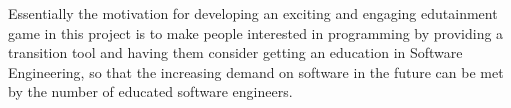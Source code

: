 Essentially the motivation for developing an exciting and engaging edutainment game in this project is to make people interested in programming by providing a transition tool and having them consider getting an education in Software Engineering, so that the increasing demand on software in the future can be met by the number of educated software engineers.\citep{idaArtikelMangel}